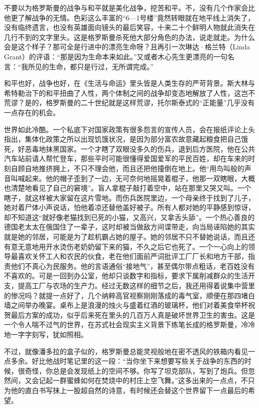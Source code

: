 不要以为格罗斯曼的战争与和平就是美化战争，挖苦和平。不，没有几个作家会比他更了解战争的无情。色彩这么丰富的“6—1号楼”竟然转眼就在地平线上消失了，没有临终遗言，也没有英雄面向镜头的最后笑容，十来二十个鲜明人物就此消失在几行不到的文字里头。这是格罗斯曼杀死他大部分角色的办法，说走就走。为什么会是这个样子？那可全是行进中的漂亮生命呀？且再引一次琳达·格兰特（Linda Grant）的评语：“那是因为生命本来如此。”又或者木心先生更漂亮的一句名言：“我所见的生命，都只是行过，无所谓完成。”

和平也好，战争也好，在《生活与命运》里头皆是人类生存的严苛背景。斯大林与希特勒治下的和平扭曲了人性，两个体制之间的战争却变态地解放了人性，这岂不荒谬？是的，格罗斯曼的二十世纪就是这样荒谬，托尔斯泰式的“正能量”几乎没有一点存在的机会。

世界如此冷酷。一个私底下对国家政策有很多怨言的宣传人员，会在报纸评论上头指出，集体化政策之所以出现饥饿状况，是因为部分富农故意藏起粮食把自己饿死，好恶毒地抹黑国家。一个才瞎了双眼没多久的伤兵，退到后方医院，他在公共汽车站前请人帮忙登车，那些平时可能很懂得爱国爱军的平民百姓，却在车来的时刻自顾自地推挤拥上，不只不理会他，而且还把他撞倒在地上。他“用鸟叫般的声音叫喊起来。他的帽子歪到了一边，无可奈何地摇晃着棍子，他那一双瞎眼，大概也清楚地看见了自己的窘境”。盲人拿棍子敲打着空中，站在那里又哭又叫。一个瞎子，就这样被大家留在这片雪地。而伤兵医院里边，一个母亲终于找到了儿子，她对着尸体小声说话，怕他着凉还替他盖好被子。所有人都对她的平静感到惊讶，却不知道这“就好像老猫找到已死的小猫，又高兴，又拿舌头舔”。一个热心善良的德国老太太在俄国住了一辈子，这时却被当做敌方间谍带走，向当局诬陷她的其实就是她的邻居，可能是为了趁机霸占她的屋子。她的邻居不只不替她说话，而且还有意无意地用开水烫伤老奶奶留下来的猫，不久之后它也死了。一个一心向上的领导最喜欢关怀工人和农民的伙食，老在他们面前严词批评工厂厂长和地方干部，指责他们不真心为民服务。他的言语通俗“接地气”，甚至偶尔带点粗话，老百姓没有不喜欢的。可是一回到办公室，他却只谈数字和指标，要求下属削减群众的生活开支，提高工厂与农场的生产力。经过无数这样的细节之后，我还用得着说集中营里的惨况吗？就提一点好了，几个纳粹高官视察刚刚落成的毒气室，顺便在那四堵白墙之间举办晚宴。桌布上是浪漫的烛火与盛着红酒的玻璃杯，他们对着美食举杯祝贺最后方案的成功，似乎后来死在里头的几百万人真是破坏世界卫生的害虫。这是一个令人喘不过气的世界，在苏式社会现实主义背景下练笔长成的格罗斯曼，冷冷地一字字刻写，犹如照相。

不过，就像潘多拉的盒子似的，格罗斯曼总能灵视般地在密不透风的铁箱内看见一点多余。好比他战时笔记里的这一段：“当你坐下来想要写些关于战争的东西的时候，很奇怪，你总是会发现纸上的空间不够。你写了坦克部队，写到了炮兵。但忽然间，又会记起一群蜜蜂如何在焚烧中的村庄上空飞舞。”这多出来的一点点，不只为他的直白书写抹上一股超自然的诗意，有时候还会替这个世界留下一点最后的希望。

